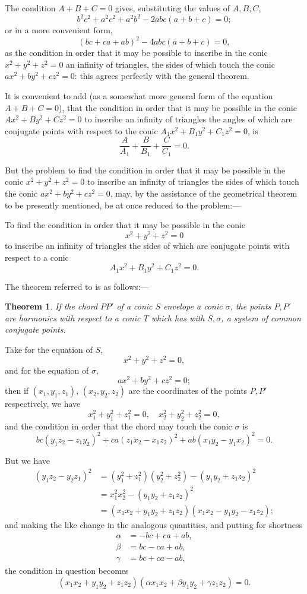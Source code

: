 \documentclass[12pt,a4paper]{article}
\theoremstyle{plain}
\newtheorem*{theorem*}{Theorem}
\begin{document}
The condition $A+B+C=0$ gives, substituting the values of $A,B,C$,
\[
b^2c^2+a^2c^2+a^2b^2-2abc(a+b+c)=0;
\]
or in a more convenient form,
\[
(bc+ca+ab)^2-4abc(a+b+c)=0,
\]
as the condition in order that it may be possible to inscribe in the conic $x^2+y^2+z^2=0$ an infinity of triangles, the sides of which touch the conic $ax^2+by^2+cz^2=0$: this agrees perfectly with the general theorem.

\medskip

It is convenient to add (as a somewhat more general form of the equation $A+B+C=0$), that the condition in order that it may be possible in the conic $Ax^2+By^2+Cz^2=0$ to inscribe an infinity of triangles the angles of which are conjugate points with respect to the conic $A_1x^2+B_1y^2+C_1z^2=0$, is
\[
\frac{A}{A_1}+\frac{B}{B_1}+\frac{C}{C_1}=0.
\]

\medskip

But the problem to find the condition in order that it may be possible in the conic $x^2+y^2+z^2=0$ to inscribe an infinity of triangles the sides of which touch the conic $ax^2+by^2+cz^2=0$, may, by the assistance of the geometrical theorem to be presently mentioned, be at once reduced to the problem:---

To find the condition in order that it may be possible in the conic
\[
x^2+y^2+z^2=0
\]
to inscribe an infinity of triangles the sides of which are conjugate points with respect to a conic
\[
A_1x^2+B_1y^2+C_1z^2=0.
\]

The theorem referred to is as follows:---

\begin{theorem*}
If the chord $PP'$ of a conic $S$ envelope a conic $\sigma$, the points $P,P'$ are harmonics with respect to a conic $T$ which has with $S,\sigma$, a system of common conjugate points.
\end{theorem*}

Take for the equation of $S$,
\[
x^2+y^2+z^2=0,
\]
and for the equation of $\sigma$,
\[
ax^2+by^2+cz^2=0;
\]
then if $(x_1,y_1,z_1)$, $(x_2,y_2,z_2)$ are the coordinates of the points $P,P'$ respectively, we have
\[
x_1^2+y_1^2+z_1^2=0,\quad x_2^2+y_2^2+z_2^2=0,
\]
and the condition in order that the chord may touch the conic $\sigma$ is
\[
bc(y_1z_2-z_1y_2)^2+ca(z_1x_2-x_1z_2)^2+ab(x_1y_2-y_1x_2)^2=0.
\]

But we have
\begin{align*}
(y_1z_2-y_2z_1)^2 &= (y_1^2+z_1^2)(y_2^2+z_2^2)-(y_1y_2+z_1z_2)^2\\
&= x_1^2x_2^2-(y_1y_2+z_1z_2)^2\\
&= (x_1x_2+y_1y_2+z_1z_2)(x_1x_2-y_1y_2-z_1z_2);
\end{align*}
and making the like change in the analogous quantities, and putting for shortness
\begin{align*}
\alpha &= -bc+ca+ab,\\
\beta &= bc-ca+ab,\\
\gamma &= bc+ca-ab,
\end{align*}
the condition in question becomes
\[
(x_1x_2+y_1y_2+z_1z_2)(\alpha x_1x_2+\beta y_1y_2+\gamma z_1z_2)=0.
\]
\end{document}
